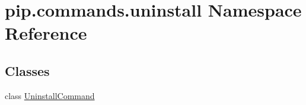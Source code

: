 \hypertarget{namespacepip_1_1commands_1_1uninstall}{}\section{pip.\+commands.\+uninstall Namespace Reference}
\label{namespacepip_1_1commands_1_1uninstall}
\subsection*{Classes}
\begin{DoxyCompactItemize}
\item 
class \hyperlink{classpip_1_1commands_1_1uninstall_1_1_uninstall_command}{Uninstall\+Command}
\end{DoxyCompactItemize}
